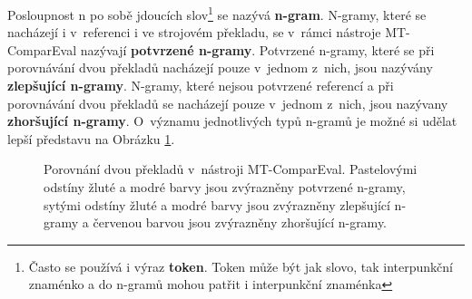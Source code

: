 Posloupnost n po sobě jdoucích slov\footnote{
  Často se používá i výraz \textbf{token}. Token může být jak slovo, tak interpunkční znaménko a do \mbox{n-gramů} mohou patřit i interpunkční znaménka}
  se nazývá \textbf{\mbox{n-gram}}.
N-gramy,
  které se nacházejí i v~referenci i ve strojovém překladu,
  se v~rámci nástroje MT-ComparEval nazývají \textbf{potvrzené \mbox{n-gramy}}.
Potvrzené \mbox{n-gramy},
  které se při porovnávání dvou překladů nacházejí pouze v~jednom z~nich,
  jsou nazývány \textbf{zlepšující \mbox{n-gramy}}.
N-gramy,
  které nejsou potvrzené referencí
  a při porovnávání dvou překladů se nacházejí pouze v~jednom z~nich,
  jsou nazývany \textbf{zhoršující \mbox{n-gramy}}.
O~významu jednotlivých typů \mbox{n-gramů} je možné si udělat lepší představu na Obrázku \ref{img:n-grams}.

\begin{figure}

	\caption{
		Porovnání dvou překladů v~nástroji MT-ComparEval.
		Pastelovými odstíny žluté a modré barvy jsou zvýrazněny potvrzené \mbox{n-gramy},
		sytými odstíny žluté a modré barvy jsou zvýrazněny zlepšující \mbox{n-gramy}
		a červenou barvou jsou zvýrazněny zhoršující \mbox{n-gramy}.
	}
	\label{img:n-grams}
\end{figure}

